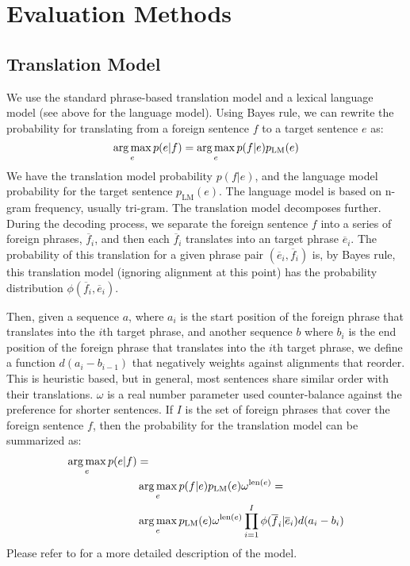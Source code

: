 \documentclass[twocolumn]{article}
\begin{document}
\section{Evaluation Methods}
\subsection{Translation Model}
We use the standard phrase-based translation model and a lexical language
model (see above for the language model).
Using Bayes rule, we can rewrite the probability for translating from a
foreign sentence $f$ to a target sentence $e$ as:
\[
  \operatorname*{arg\,max}_e p(e|f) = \operatorname*{arg\,max}_e p(f|e) p_{\text{LM}}(e)
\]
We have the translation model probability $p(f|e)$, and the language model
probability for the target sentence $p_{\text{LM}}(e)$.
The language model is based on n-gram frequency, usually tri-gram.
The translation model decomposes further. During the decoding
process, we separate the foreign sentence $f$ into a series of foreign phrases,
$\overline{f}_i$, and then each $\overline{f}_i$ translates into an target
phrase $\overline{e}_i$. The probability of this translation for a given phrase
pair $(\overline{e}_i, \overline{f}_i)$ is, by Bayes rule, this translation
model (ignoring alignment at this point) has the probability distribution
$\phi(\overline{f}_i, \overline{e}_i)$.


Then, given a sequence $a$, where $a_i$ is the start position of the foreign
phrase that translates into the $i$th target phrase,
and another sequence $b$ where $b_i$ is the end position of the foreign phrase
that translates into the $i$th target phrase,
we define a function $d(a_i - b_{i-1})$ that negatively weights against
alignments that reorder. This is heuristic based, but in general, most sentences
share similar order with their translations. $\omega$ is a real number
parameter used counter-balance against the preference for shorter sentences.
If $I$ is the set of foreign phrases that cover the foreign sentence $f$, then
the probability for the translation model can be summarized as:
\begin{align*}
  \operatorname*{arg\,max}_e p(e|f) & = \\
      & \operatorname*{arg\,max}_e p(f|e) p_{\text{LM}}(e) \omega^{\text{len}(e)} = \\
      & \operatorname*{arg\,max}_e p_{\text{LM}}(e) \omega^{\text{len}(e)}
                  \prod_{i=1}^I \phi(\overline{f}_i | \overline{e}_i)
                              d(a_i - b_{i})
\end{align*}
Please refer to \cite{kom2003} for a more detailed description of the model.
\end{document}
